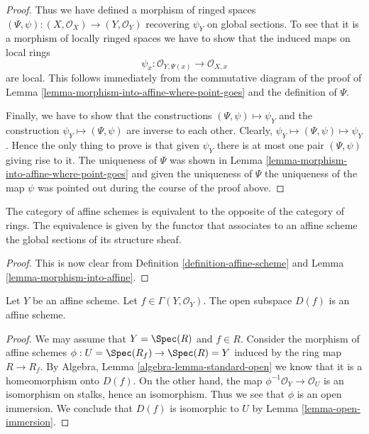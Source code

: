 \begin{proof}
\medskip\noindent
Thus we have defined a morphism of ringed spaces
$(\Psi, \psi) : (X, \mathcal{O}_X) \to (Y, \mathcal{O}_Y)$
recovering $\psi_Y$ on global sections. To see that it is
a morphism of locally ringed spaces we have to show that
the induced maps on local rings
$$
\psi_x : \mathcal{O}_{Y, \Psi(x)} \longrightarrow \mathcal{O}_{X, x}
$$
are local. This follows immediately from the commutative diagram
of the proof of Lemma \ref{lemma-morphism-into-affine-where-point-goes}
and the definition of $\Psi$.

\medskip\noindent
Finally, we have to show that the constructions
$(\Psi, \psi) \mapsto \psi_Y$ and the construction
$\psi_Y \mapsto (\Psi, \psi)$ are inverse to each other.
Clearly, $\psi_Y \mapsto (\Psi, \psi) \mapsto \psi_Y$.
Hence the only thing to prove is that given $\psi_Y$
there is at most one pair $(\Psi, \psi)$ giving rise
to it. The uniqueness of $\Psi$ was shown in Lemma
\ref{lemma-morphism-into-affine-where-point-goes} and
given the uniqueness of $\Psi$ the uniqueness of the
map $\psi$ was pointed out during the course of the proof
above.
\end{proof}

\begin{lemma}
\label{lemma-category-affine-schemes}
The category of affine schemes is equivalent to the opposite of the
category of rings. The equivalence is given by the functor that associates
to an affine scheme the global sections of its structure sheaf.
\end{lemma}

\begin{proof}
This is now clear from Definition \ref{definition-affine-scheme}
and Lemma \ref{lemma-morphism-into-affine}.
\end{proof}

\begin{lemma}
\label{lemma-standard-open-affine}
Let $Y$ be an affine scheme.
Let $f \in \Gamma(Y, \mathcal{O}_Y)$.
The open subspace $D(f)$ is an affine scheme.
\end{lemma}

\begin{proof}
We may assume that $Y = \Spec(R)$ and $f \in R$.
Consider the morphism of affine schemes
$\phi : U = \Spec(R_f) \to \Spec(R) = Y$ induced by the ring
map $R \to R_f$. By Algebra, Lemma \ref{algebra-lemma-standard-open}
we know that it is a homeomorphism onto $D(f)$.
On the other hand, the map $\phi^{-1}\mathcal{O}_Y \to \mathcal{O}_U$
is an isomorphism on stalks, hence an isomorphism. Thus we see
that $\phi$ is an open immersion. We conclude that $D(f)$
is isomorphic to $U$ by Lemma \ref{lemma-open-immersion}.
\end{proof}

